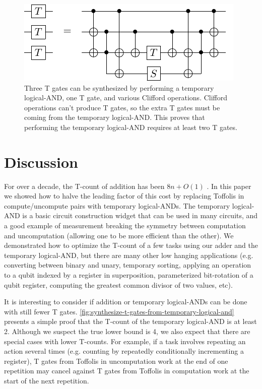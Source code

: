 \documentclass[twocolumn]{quantumarticle-customized}
\begin{document}
\begin{figure}
  \includegraphics[width=\linewidth]{synthesize-t-gates-from-temporary-logical-and.pdf}
  \caption{
	Three T gates can be synthesized by performing a temporary logical-AND, one T gate, and various Clifford operations.
	Clifford operations can't produce T gates, so the extra T gates must be coming from the temporary logical-AND.
	This proves that performing the temporary logical-AND requires at least two T gates.
  }
  \label{fig:synthesize-t-gates-from-temporary-logical-and}
\end{figure}


\section*{Discussion}

For over a decade, the T-count of addition has been $8n + O(1)$ \cite{Amy2013, Barenco1995, Cuccaro2004}.
In this paper we showed how to halve the leading factor of this cost by replacing Toffolis in compute/uncompute pairs with temporary logical-ANDs.
The temporary logical-AND is a basic circuit construction widget that can be used in many circuits, and a good example of measurement breaking the symmetry between computation and uncomputation (allowing one to be more efficient than the other).
We demonstrated how to optimize the T-count of a few tasks using our adder and the temporary logical-AND, but there are many other low hanging applications (e.g. converting between binary and unary, temporary sorting, applying an operation to a qubit indexed by a register in superposition, parameterized bit-rotation of a qubit register, computing the greatest common divisor of two values, etc).

It is interesting to consider if addition or temporary logical-ANDs can be done with still fewer T gates.
\autoref{fig:synthesize-t-gates-from-temporary-logical-and} presents a simple proof that the T-count of the temporary logical-AND is at least 2.
Although we suspect the true lower bound is 4, we also expect that there are special cases with lower T-counts.
For example, if a task involves repeating an action several times (e.g. counting by repeatedly conditionally incrementing a register), T gates from Toffolis in uncomputation work at the end of one repetition may cancel against T gates from Toffolis in computation work at the start of the next repetition.
\end{document}

